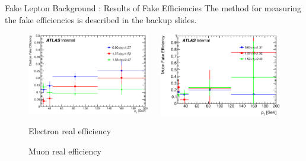 \documentclass[mathserif,serif]{beamer}
\begin{document}
\begin{frame}{Fake Lepton Background : Results of Fake Efficiencies}
The method for measuring the fake efficiencies is described in the backup slides.
\begin{figure}
\begin{columns}

\begin{column}{0.5\textwidth}
\includegraphics[width=\textwidth]{data/plot/getFakeEffs/El_hEff.eps}
\caption{Electron real efficiency}
\end{column}

\begin{column}{0.5\textwidth}
\includegraphics[width=\textwidth]{data/plot/getFakeEffs/Mu_hEff.eps}
\caption{Muon real efficiency}
\end{column}

\end{columns}
\end{figure}
\end{frame}
\end{document}
